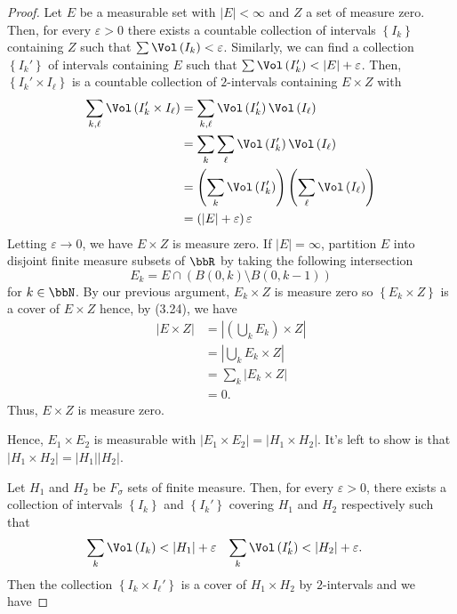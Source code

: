 \begin{proof}
Let $E$ be a measurable set with $\left|E\right|<\infty$ and $Z$ a set of
measure zero. Then, for every $\varepsilon>0$ there exists a countable
collection of intervals $\left\{I_k\right\}$ containing $Z$ such that
$\sum\Vol\left(I_k\right)<\varepsilon$. Similarly, we can find a collection
$\left\{I_k'\right\}$ of intervals containing $E$ such that
$\sum\Vol\left(I_k'\right)<\left|E\right|+\varepsilon$. Then,
$\left\{I_k'\times I_\ell\right\}$ is a countable collection of
$2$-intervals containing $E\times Z$ with
\begin{align*}
\sum_{k,\ell}\Vol\left(I_k'\times I_\ell\right)
&=\sum_{k,\ell}\Vol\left(I_k'\right)\Vol\left(I_\ell\right)\\
&=\sum_k\sum_\ell\Vol\left(I_k'\right)\Vol\left(I_\ell\right)\\
&=\left(\sum_k\Vol\left(I_k'\right)\right)
\left(\sum_\ell\Vol\left(I_\ell\right)\right)\\
&=\left(\left|E\right|+\varepsilon\right)\varepsilon
\end{align*}
Letting $\varepsilon\to 0$, we have $E\times Z$ is measure zero. If
$\left|E\right|=\infty$, partition $E$ into disjoint finite measure subsets
of $\bbR$ by taking the following intersection
\[
E_k=E\cap\left(B(0,k)\setminus B(0,k-1)\right)
\]
for $k\in\bbN$. By our previous argument, $E_k\times Z$ is measure zero so
$\left\{E_k\times Z\right\}$ is a cover of $E\times Z$ hence, by
(3.24), we have
\begin{align*}
\left|E\times Z\right|
&=\left|\left(\bigcup_k E_k\right)\times Z\right|\\
&=\left|\bigcup_k E_k\times Z\right|\\
&=\sum_k \left|E_k\times Z\right|\\
&=0.
\end{align*}
Thus, $E\times Z$ is measure zero.

Hence, $E_1\times E_2$ is measurable with $\left|E_1\times
E_2\right|=\left|H_1\times H_2\right|$. It's left to show is
that $\left|H_1\times H_2\right|=\left|H_1\right|\left|H_2\right|$.

Let $H_1$ and $H_2$ be $F_\sigma$ sets of finite measure. Then, for every
$\varepsilon>0$, there exists a collection of intervals
$\left\{I_k\right\}$ and $\left\{I_k'\right\}$ covering $H_1$ and $H_2$
respectively such that
\begin{align*}
\sum_k\Vol\left(I_k\right)&<\left|H_1\right|+\varepsilon&
\sum_k\Vol\left(I_k'\right)&<\left|H_2\right|+\varepsilon.
\end{align*}
Then the collection $\left\{I_k\times I_\ell'\right\}$ is a
cover of $H_1\times H_2$ by $2$-intervals and we have
\end{proof}
\newpage

